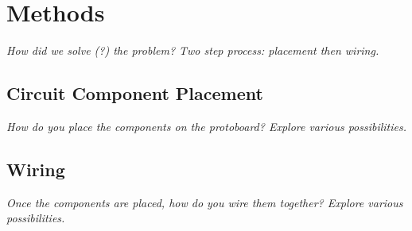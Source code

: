 
\chapter{Methods}

\textit{How did we solve (?) the problem? Two step process: placement then
wiring.}

\section{Circuit Component Placement}

\textit{How do you place the components on the protoboard? Explore various
possibilities.}

\section{Wiring}

\textit{Once the components are placed, how do you wire them together? Explore
various possibilities.}
